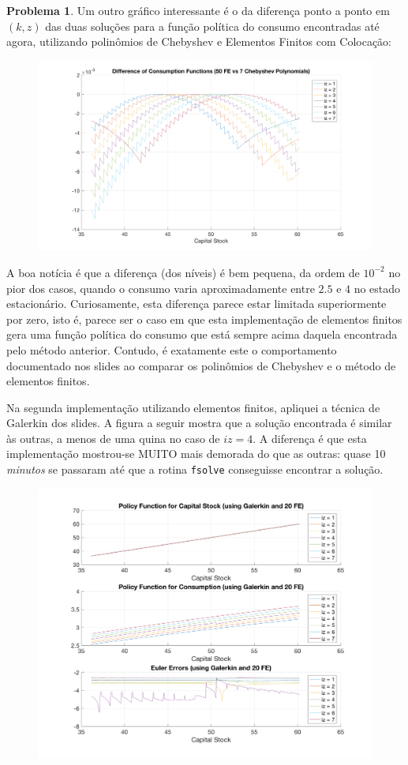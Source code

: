 \documentclass[11pt]{article}
\theoremstyle{definition}
\newtheorem{prob}{Problema}
\theoremstyle{solution}
\begin{document}
\begin{prob}
	Um outro gráfico interessante é o da diferença ponto a ponto em $(k, z)$ das duas soluções para a função política do consumo encontradas até agora, utilizando polinômios de Chebyshev e Elementos Finitos com Colocação:
	\begin{figure}[h!]
		\centering
		\includegraphics[scale = 0.2]{cheby_fe}
	\end{figure}
	
	A boa notícia é que a diferença (dos níveis) é bem pequena, da ordem de $10^{-2}$ no pior dos casos, quando o consumo varia aproximadamente entre $2.5$ e $4$ no estado estacionário. Curiosamente, esta diferença parece estar limitada superiormente por zero, isto é, parece ser o caso em que esta implementação de elementos finitos gera uma função política do consumo que está sempre acima daquela encontrada pelo método anterior. Contudo, é exatamente este o comportamento documentado nos slides ao comparar os polinômios de Chebyshev e o método de elementos finitos.
	
	Na segunda implementação utilizando elementos finitos, apliquei a técnica de Galerkin dos slides. A figura a seguir mostra que a solução encontrada é similar às outras, a menos de uma quina no caso de $iz = 4$. A diferença é que esta implementação mostrou-se MUITO mais demorada do que as outras: quase 10 \textit{minutos} se passaram até que a rotina \texttt{fsolve} conseguisse encontrar a solução.
	\begin{figure}[h!]
		\centering
		\includegraphics[scale = 0.25]{galerkin}
	\end{figure}
	

\end{prob}
\end{document}
